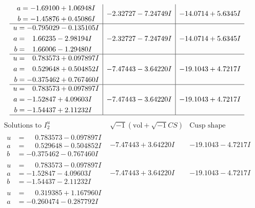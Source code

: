 \documentclass[1p]{elsarticle_modified}
\theoremstyle{definition}
\newcommand{\I}{\sqrt{-1}}
\begin{document}
$$\begin{array}{c|c|c}
\begin{aligned}
a &= -1.69100 + 1.06948 I \\
b &= -1.45876 + 0.45086 I\end{aligned}
 & -2.32727 - 7.24749 I & -14.0714 + 5.6345 I \\ \hline\begin{aligned}
u &= -0.795029 - 0.135105 I \\
a &= \phantom{-}1.66235 - 2.98194 I \\
b &= \phantom{-}1.66006 - 1.29480 I\end{aligned}
 & -2.32727 - 7.24749 I & -14.0714 + 5.6345 I \\ \hline\begin{aligned}
u &= \phantom{-}0.783573 + 0.097897 I \\
a &= \phantom{-}0.529648 + 0.504852 I \\
b &= -0.375462 + 0.767460 I\end{aligned}
 & -7.47443 - 3.64220 I & -19.1043 + 4.7217 I \\ \hline\begin{aligned}
u &= \phantom{-}0.783573 + 0.097897 I \\
a &= -1.52847 + 4.09603 I \\
b &= -1.54437 + 2.11232 I\end{aligned}
 & -7.47443 - 3.64220 I & -19.1043 + 4.7217 I\\
 \hline 
 \end{array}$$\newpage$$\begin{array}{c|c|c}  
\text{Solutions to }I^u_{2}& \I (\text{vol} + \sqrt{-1}CS) & \text{Cusp shape}\\
 \hline 
\begin{aligned}
u &= \phantom{-}0.783573 - 0.097897 I \\
a &= \phantom{-}0.529648 - 0.504852 I \\
b &= -0.375462 - 0.767460 I\end{aligned}
 & -7.47443 + 3.64220 I & -19.1043 - 4.7217 I \\ \hline\begin{aligned}
u &= \phantom{-}0.783573 - 0.097897 I \\
a &= -1.52847 - 4.09603 I \\
b &= -1.54437 - 2.11232 I\end{aligned}
 & -7.47443 + 3.64220 I & -19.1043 - 4.7217 I \\ \hline\begin{aligned}
u &= \phantom{-}0.319385 + 1.167960 I \\
a &= -0.260474 - 0.287792 I \\

\end{aligned}
\end{array}$$
\end{document}
